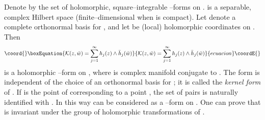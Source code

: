 \documentclass[a4paper,a4paper]{article}
\begin{document}
Denote by \coordHE{} the set of holomorphic, square--integrable \coordHE{}--forms on \coordHE{}.
\coordHE{} is a separable, complex Hilbert space (finite--dimensional when \coordHE{} is compact).
Let \coordHE{} denote a complete orthonormal basis for \coordHE{}, and let \coordHE{} be (local) 
holomorphic coordinates on \coordHE{}. Then
\begin{equation}\coord{}\boxEquation{
{\cal K}(z, \bar w)=\sum_{j=1}^{\infty}h_j(z)\wedge\bar h_j(\bar w)
\label{kaka}
}{
{\cal K}(z, \bar w)=\sum_{j=1}^{\infty}h_j(z)\wedge\bar h_j(\bar w)
}{ecuacion}\coordE{}\end{equation}
is a holomorphic \coordHE{}--form on \coordHE{}, where \coordHE{}
is complex manifold conjugate to \coordHE{}. The form \coordHE{} is 
independent of the choice of an orthonormal basis for \coordHE{}; it is called 
the {\it kernel form}\/ of \coordHE{}. If \coordHE{} is the point of \coordHE{} 
corresponding to a point \coordHE{}, the set of pairs \coordHE{} is naturally identified with \coordHE{}. In this way \coordHE{} can be considered as a \coordHE{}--form on 
\coordHE{}. One can prove that \coordHE{} is invariant under the group 
of holomorphic transformations of \coordHE{}.
\end{document}
